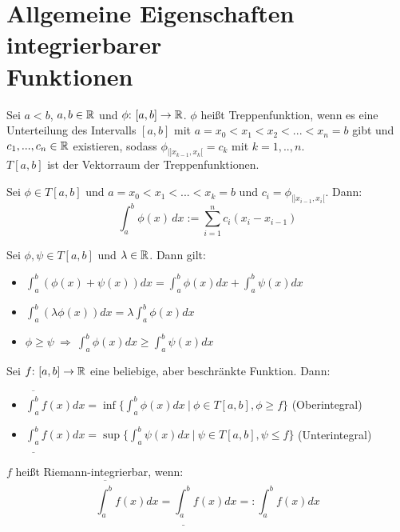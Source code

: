 \section{Allgemeine Eigenschaften integrierbarer\\ Funktionen}

\begin{frameddefn}[Treppenfunktion]
	Sei $a < b$, $a,b \in \mathbb{R}$ und $\phi{:}\  [a,b] \to \mathbb{R}$. $\phi$ heißt Treppenfunktion, wenn es eine Unterteilung des Intervalls $[a,b]$ mit $a= x_0 < x_1 < x_2 < ... < x_n = b$ gibt und $c_1,...,c_n \in \mathbb{R}$ existieren, sodass $\phi_{|]x_{k-1}, x_{k}[} = c_k$ mit $k= 1,..,n$.\\
	$T[a,b]$ ist der Vektorraum der Treppenfunktionen.
\end{frameddefn}

\begin{frameddefn}
	Sei $\phi \in T[a,b]$ und $a=x_0 < x_1 < ... < x_k = b$ und $c_i = \phi_{|]x_{i-1}, x_{i}[}$. Dann:
	\[
	\int_{a}^{b} \phi(x) \, dx := \sum_{i=1}^{n} c_i (x_i - x_{i-1})
	\]
\end{frameddefn}

\begin{framedthm}
	Sei $\phi, \psi \in T[a,b]$ und $\lambda \in \mathbb{R}$. Dann gilt:
	\begin{itemize}
		\item $\int_{a}^{b} (\phi(x) + \psi(x))dx = \int_{a}^{b} \phi(x) dx + \int_{a}^{b} \psi(x) dx$
		\item $\int_{a}^{b} (\lambda\phi(x))dx = \lambda \int_{a}^{b} \phi(x)dx$
		\item $\phi \geq \psi \ \Rightarrow\ \int_{a}^{b} \phi(x)dx \geq \int_{a}^{b} \psi(x)dx$
	\end{itemize}
\end{framedthm}

\begin{frameddefn}
	Sei $f{:}\  [a,b] \to \mathbb{R}$ eine beliebige, aber beschränkte Funktion. Dann:
	\begin{itemize}
		\item $\overline{\int_{a}^{b}} f(x)dx = \inf\{\int_{a}^{b} \phi(x)dx \ |\ \phi \in T[a,b], \phi \geq f\}$ (Oberintegral)
		\item $\underline{\int_{a}^{b}} f(x)dx = \sup\{\int_{a}^{b} \psi(x)dx \ |\ \psi \in T[a,b], \psi \leq f\}$ (Unterintegral)
	\end{itemize}
	$f$ heißt Riemann-integrierbar, wenn:
	\[
	\overline{\int_{a}^{b}} f(x)dx = \underline{\int_{a}^{b}} f(x)dx =: \int_{a}^{b} f(x)dx
	\]
\end{frameddefn}

